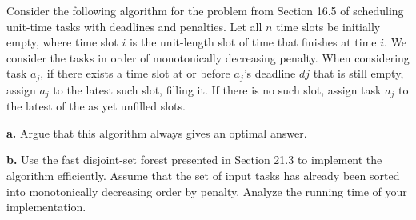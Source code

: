 Consider the following algorithm for the problem from Section 16.5 
of scheduling unit-time tasks with deadlines and penalties. Let all 
$n$ time slots be initially empty, where time slot $i$ is the unit-length 
slot of time that finishes at time $i$. We consider the tasks in order 
of monotonically decreasing penalty. When considering task $a_j$, 
if there exists a time slot at or before $a_j$'s deadline $dj$ that is still
empty, assign $a_j$ to the latest such slot, filling it. If there is no 
such slot, assign task $a_j$ to the latest of the as yet unfilled slots.

\textbf{a.} Argue that this algorithm always gives an optimal answer.

\textbf{b.} Use the fast disjoint-set forest presented in Section 21.3 to 
implement the algorithm efficiently. Assume that the set of input 
tasks has already been sorted into monotonically decreasing order by 
penalty. Analyze the running time of your implementation.